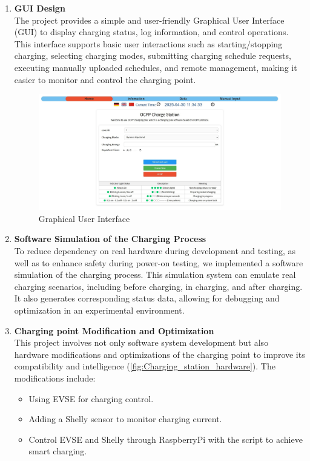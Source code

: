\documentclass[
	english,
	ruledheaders=section,%
	class=report,%
	thesis={type=Report},%
	accentcolor=9c,%
	custommargins=true,%
	marginpar=false,%
	parskip=half-,%
	fontsize=11pt,%
	logofile={img/tuda_logo.pdf}, %
]{tudapub}
\begin{document}
\begin{enumerate}
    \item \textbf{\ac{GUI} Design}\\
    The project provides a simple and user-friendly Graphical User Interface (\ac{GUI}) to display charging status, log information, and control operations. This interface supports basic user interactions such as starting/stopping charging, selecting charging modes, submitting charging schedule requests, executing manually uploaded schedules, and remote management, making it easier to monitor and control the charging point.
    \begin{figure}[H]
        \centering
        \includegraphics[width=0.8\linewidth]{img/light_GUI.png}
        \caption{Graphical User Interface}
        \label{fig:light_GUI}
    \end{figure}
    
    \item \textbf{Software Simulation of the Charging Process}\\
    To reduce dependency on real hardware during development and testing, as well as to enhance safety during power-on testing, we implemented a software simulation of the charging process. This simulation system can emulate real charging scenarios, including before charging, in charging, and after charging. It also generates corresponding status data, allowing for debugging and optimization in an experimental environment.
    
    \item \textbf{Charging point Modification and Optimization}\\
    This project involves not only software system development but also hardware modifications and optimizations of the charging point to improve its compatibility and intelligence (\autoref{fig:Charging_station_hardware}). The modifications include:
    \begin{itemize}
        \item Using EVSE for charging control.
        \item Adding a Shelly sensor to monitor charging current.
        \item Control EVSE and Shelly through RaspberryPi with the script to achieve smart charging.
    \end{itemize}


\end{enumerate}
\end{document}
